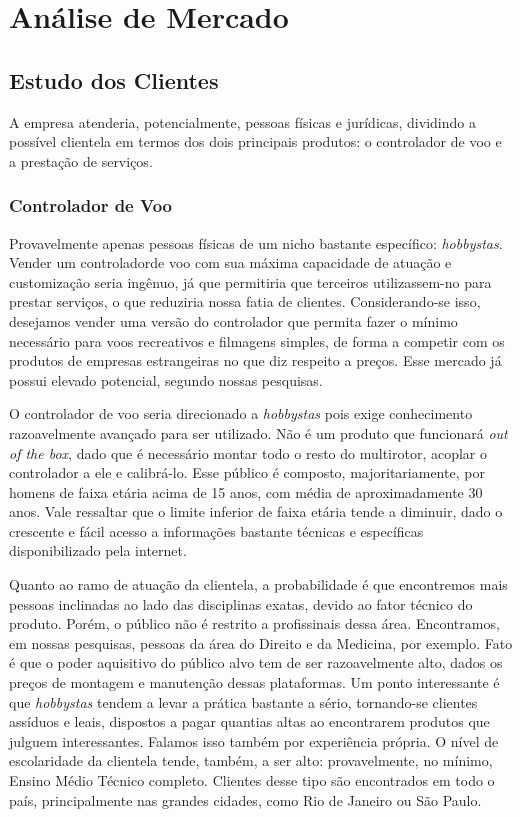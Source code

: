 \section{Análise de Mercado}

\subsection{Estudo dos Clientes}

A empresa atenderia, potencialmente, pessoas físicas e jurídicas, dividindo a possível clientela em termos
dos dois principais produtos: o controlador de voo e a prestação de serviços.

\subsubsection*{Controlador de Voo}

Provavelmente apenas pessoas físicas de um nicho bastante específico: \emph{hobbystas}. Vender um controladorde voo com sua máxima capacidade de atuação e customização seria ingênuo, já que permitiria que terceiros utilizassem-no para prestar serviços, o que reduziria nossa fatia de clientes. Considerando-se isso, desejamos vender uma versão do controlador que permita fazer o mínimo necessário para voos recreativos e filmagens simples, de forma a competir com os produtos de empresas estrangeiras no que diz respeito a preços. Esse mercado já possui elevado potencial, segundo nossas pesquisas.

O controlador de voo seria direcionado a \emph{hobbystas} pois exige conhecimento razoavelmente avançado para ser utilizado. Não é um produto que funcionará \emph{out of the box}, dado que é necessário montar todo o resto do multirotor, acoplar o controlador a ele e calibrá-lo. Esse público é composto, majoritariamente, por homens de faixa etária acima de 15 anos, com média de aproximadamente 30 anos. Vale ressaltar que o limite inferior de faixa etária tende a diminuir, dado o crescente e fácil acesso a informações bastante técnicas e específicas disponibilizado pela internet.

Quanto ao ramo de atuação da clientela, a probabilidade é que encontremos mais pessoas inclinadas ao lado das disciplinas exatas, devido ao fator técnico do produto. Porém, o público não é restrito a profissinais dessa área. Encontramos, em nossas pesquisas, pessoas da área do Direito e da Medicina, por exemplo. Fato é que o poder aquisitivo do público alvo tem de ser razoavelmente alto, dados os preços de montagem e manutenção dessas plataformas. Um ponto interessante é que \emph{hobbystas} tendem a levar a prática bastante a sério, tornando-se clientes assíduos e leais, dispostos a pagar quantias altas ao encontrarem produtos que julguem interessantes. Falamos isso também por experiência própria. O nível de escolaridade da clientela tende, também, a ser alto: provavelmente, no mínimo, Ensino Médio Técnico completo. Clientes desse tipo são encontrados em todo o país, principalmente nas grandes cidades, como Rio de Janeiro ou São Paulo.

